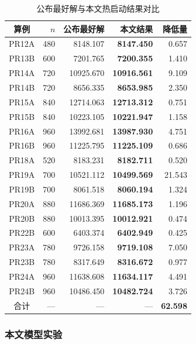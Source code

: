 \documentclass{setp-new}
\newcommand{\setptabsetup}{\fontsize{9pt}{10.5pt}\selectfont\renewcommand{\arraystretch}{0.95}\setlength{\tabcolsep}{2.2pt}\setlength{\aboverulesep}{0.4pt}\setlength{\belowrulesep}{0.4pt}\hbadness=10000}
\begin{document}
\begin{table}[H]
\centering
\caption{公布最好解与本文热启动结果对比}
\label{tab:v13-improved}
\setptabsetup
\begin{tabular*}{\linewidth}{@{\extracolsep{\fill}}crrrr@{}}
\toprule
算例 & $n$ & 公布最好解 & 本文结果 & 降低量\\
\midrule
PR12A & 480 & 8148.107 & \textbf{8147.450} & 0.657 \\
PR13B & 600 & 7201.765 & \textbf{7200.355} & 1.410 \\
PR14A & 720 & 10925.670 & \textbf{10916.561} & 9.109 \\
PR14B & 720 & 8656.335 & \textbf{8653.985} & 2.350 \\
PR15A & 840 & 12714.063 & \textbf{12713.312} & 0.751 \\
PR15B & 840 & 10223.105 & \textbf{10221.947} & 1.158 \\
PR16A & 960 & 13992.681 & \textbf{13987.930} & 4.751 \\
PR16B & 960 & 11225.795 & \textbf{11225.109} & 0.686 \\
PR18A & 520 & 8183.231 & \textbf{8182.711} & 0.520 \\
PR19A & 700 & 10521.112 & \textbf{10499.569} & 21.543 \\
PR19B & 700 & 8061.518 & \textbf{8060.194} & 1.324 \\
PR20A & 880 & 11686.369 & \textbf{11685.173} & 1.196 \\
PR20B & 880 & 10013.395 & \textbf{10012.921} & 0.474 \\
PR22B & 600 & 6403.374 & \textbf{6402.949} & 0.425 \\
PR23A & 780 & 9726.158 & \textbf{9719.108} & 7.050 \\
PR23B & 780 & 8317.649 & \textbf{8316.672} & 0.977 \\
PR24A & 960 & 11638.608 & \textbf{11634.117} & 4.491 \\
PR24B & 960 & 10486.450 & \textbf{10482.724} & 3.726 \\
\midrule
合计 & --- & --- & --- & \textbf{62.598} \\
\bottomrule
\end{tabular*}
\end{table}

\subsubsection{本文模型实验}
\end{document}
